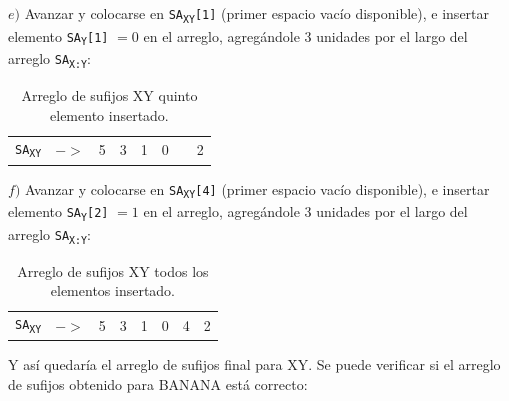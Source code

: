$e)$ Avanzar y colocarse en \texttt{SA\textsubscript{XY}[1]} (primer espacio vacío disponible), e insertar elemento \texttt{SA\textsubscript{Y}[1]} $= 0$ en el arreglo, agregándole 3 unidades por el largo del arreglo \texttt{SA\textsubscript{X:Y}}:

\begin{table}[!hbt]
\centering
\begin{tabular}{cc|c|c|c|c|c|c|}
\cline{3-8}
\texttt{SA\textsubscript{XY}} &  $->$ & 5 & 3 & 1 & 0 &  & 2 \\ \cline{3-8} 
\end{tabular}
\caption{Arreglo de sufijos XY quinto elemento insertado.}
\end{table}

$f)$ Avanzar y colocarse en \texttt{SA\textsubscript{XY}[4]} (primer espacio vacío disponible), e insertar elemento \texttt{SA\textsubscript{Y}[2]} $= 1$ en el arreglo, agregándole 3 unidades por el largo del arreglo \texttt{SA\textsubscript{X:Y}}:

\newpage

\begin{table}[!hbt]
\centering
\begin{tabular}{cc|c|c|c|c|c|c|}
\cline{3-8}
\texttt{SA\textsubscript{XY}} &  $->$ & 5 & 3 & 1 & 0 & 4 & 2 \\ \cline{3-8} 
\end{tabular}
\caption{Arreglo de sufijos XY todos los elementos insertado.}
\end{table}

Y así quedaría el arreglo de sufijos final para XY. Se puede verificar si el arreglo de sufijos obtenido para BANANA está correcto:

